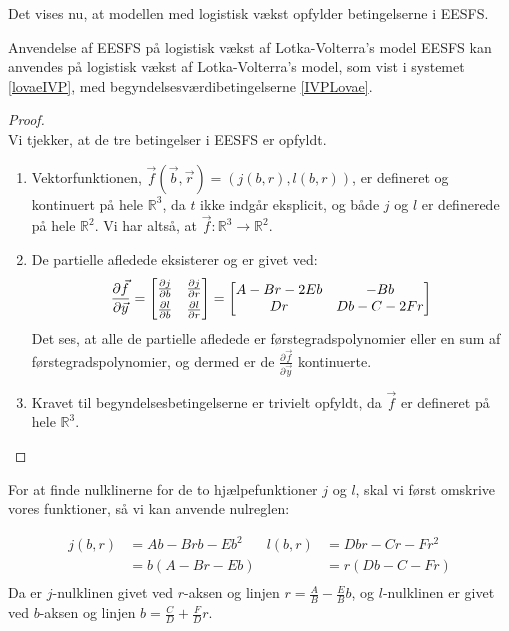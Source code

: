 Det vises nu, at modellen med logistisk vækst opfylder betingelserne i EESFS.

\begin{lemma}{Anvendelse af EESFS på logistisk vækst af Lotka-Volterra's model}{}
EESFS kan anvendes på logistisk vækst af Lotka-Volterra's model, som vist i systemet \eqref{lovaeIVP}, med begyndelsesværdibetingelserne \eqref{IVPLovae}.
\end{lemma}

\begin{proof}\\
    Vi tjekker, at de tre betingelser i EESFS er opfyldt.
    \hfill \break
    \begin{enumerate}
        \item Vektorfunktionen, $\vec{f}(\vec{b},\vec{r}) = (j(b,r),l(b,r))$, er defineret og kontinuert på hele $\mathbb{R}^3$, da $t$ ikke indgår eksplicit, og både $j$ og $l$ er definerede på hele $\mathbb{R}^2$. Vi har altså, at $\vec{f}\colon \mathbb{R}^3\to\mathbb{R}^2$.
        \item De partielle afledede eksisterer og er givet ved:
        \begin{equation*}
        \frac{\partial\vec{f}}{\partial \vec{y}}=
         \begin{bmatrix}
        \frac{\partial j}{\partial b} & \frac{\partial j}{\partial r}\vspace{1mm}\\
        \frac{\partial l}{\partial b} & \frac{\partial l}{\partial r}
        \end{bmatrix}
        =
        \begin{bmatrix}
        A-Br-2Eb & -Bb\\
        Dr & Db-C-2Fr
        \end{bmatrix}
        \end{equation*}
        Det ses, at alle de partielle afledede er førstegradspolynomier eller en sum af førstegradspolynomier, og dermed er de  $\frac{\partial\vec{f}}{\partial \vec{y}}$ kontinuerte. 
        \item Kravet til begyndelsesbetingelserne er trivielt opfyldt, da $\vec{f}$ er defineret på hele $\mathbb{R}^3$.
    \end{enumerate}
\end{proof}

For at finde nulklinerne for de to hjælpefunktioner $j$ og $l$, skal vi først omskrive vores funktioner, så vi kan anvende nulreglen: 

\begin{equation}\label{nulkliner1}
\begin{aligned}
    j(b,r)&=Ab - Brb - Eb^2     &   l(b,r)&=Dbr-Cr-Fr^2\\
    &=b(A - Br - Eb)     &   &=r(Db-C-Fr)\\
\end{aligned}    
\end{equation}
    Da er $j$-nulklinen givet ved $r$-aksen og linjen $r=\frac{A}{B}-\frac{E}{B}b$, og  $l$-nulklinen er givet ved $b$-aksen og linjen $b=\frac{C}{D}+\frac{F}{D}r$.\\ 

